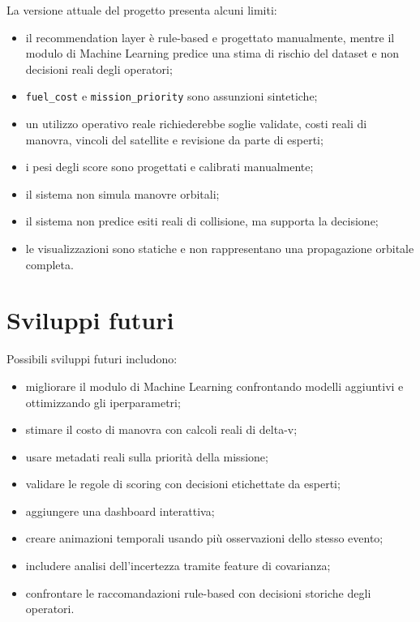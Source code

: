 \documentclass[12pt,a4paper]{article}
\begin{document}
La versione attuale del progetto presenta alcuni limiti:

\begin{itemize}
    \item il recommendation layer è rule-based e progettato manualmente, mentre il modulo di Machine Learning predice una stima di rischio del dataset e non decisioni reali degli operatori;
    \item \texttt{fuel\_cost} e \texttt{mission\_priority} sono assunzioni sintetiche;
    \item un utilizzo operativo reale richiederebbe soglie validate, costi reali di manovra, vincoli del satellite e revisione da parte di esperti;
    \item i pesi degli score sono progettati e calibrati manualmente;
    \item il sistema non simula manovre orbitali;
    \item il sistema non predice esiti reali di collisione, ma supporta la decisione;
    \item le visualizzazioni sono statiche e non rappresentano una propagazione orbitale completa.
\end{itemize}

\section{Sviluppi futuri}

Possibili sviluppi futuri includono:

\begin{itemize}
    \item migliorare il modulo di Machine Learning confrontando modelli aggiuntivi e ottimizzando gli iperparametri;
    \item stimare il costo di manovra con calcoli reali di delta-v;
    \item usare metadati reali sulla priorità della missione;
    \item validare le regole di scoring con decisioni etichettate da esperti;
    \item aggiungere una dashboard interattiva;
    \item creare animazioni temporali usando più osservazioni dello stesso evento;
    \item includere analisi dell'incertezza tramite feature di covarianza;
    \item confrontare le raccomandazioni rule-based con decisioni storiche degli operatori.
\end{itemize}
\end{document}
